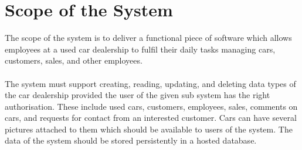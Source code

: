 \section{Scope of the System}
The scope of the system is to deliver a functional piece of software which allows employees at a used car dealership to fulfil their daily tasks managing cars, customers, sales, and other employees.\\\\
The system must support creating, reading, updating, and deleting data types of the car dealership provided the user of the given sub system has the right authorisation.
These include used cars, customers, employees, sales, comments on cars, and requests for contact from an interested customer. 
Cars can have several pictures attached to them which should be available to users of the system. 
The data of the system should be stored persistently in a hosted database. 
